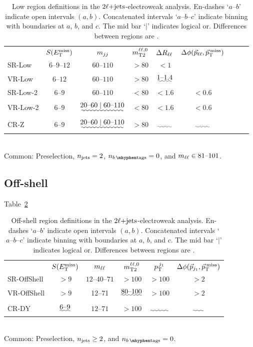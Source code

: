 \begin{table}[tp]
\centering
\begin{tabular}{lcccccccc}
& $S(E_\mathrm{T}^\mathrm{miss})$
& $m_{jj}$
& $m_\mathrm{T2}^{\ell\ell,0}$
& $\Delta R_{\ell\ell}$
& $\Delta\phi(\vec p_{\ell\ell}, \vec p_\mathrm{T}^\mathrm{\:miss})$
\\[1em]
SR-Low
& $6\textrm{--}9\textrm{--}12$
& $60\textrm{--}110$
& $> 80$
& $< 1$
&
\\[.5em]
\: VR-Low
& $6\textrm{--}12$
& $60\textrm{--}110$
& $>80$
& $\uwave{1\textrm{--}1.4}$
&
\\[1em]
SR-Low-2
& $6\textrm{--}9$
& $60\textrm{--}110$
& $< 80$
& $< 1.6$
& $< 0.6$
\\[.5em]
\: VR-Low-2
& $6\textrm{--}9$
& $\uwave{20\textrm{--}60 \mid 60\textrm{--}110}$
& $< 80$
& $< 1.6$
& $< 0.6$
\\[1em]
CR-Z
& $6\textrm{--}9$
& $\uwave{20\textrm{--}60 \mid 60\textrm{--}110}$
& $> 80$
& $\uwave{\hphantom{< 1.6}}$
& $\uwave{\hphantom{< 0.6}}$
\end{tabular}
\\[1em]
Common: Preselection,
$n_\mathrm{jets} = 2$,
$\nbtag = 0$, and
$m_{\ell\ell} \in 81\textrm{--}101$.
\caption{%
Low region definitions in the $2\ell\mathrm{+jets}$-electroweak analysis.
En-dashes `$a\textrm{--}b$' indicate open intervals $(a, b)$.
Concatenated intervals `$a\textrm{--}b\textrm{--}c$' indicate binning
with boundaries at $a$, $b$, and $c$.
The mid bar `$\mid$' indicates logical or.
Differences between regions are .
}
\label{tab:2ljets_low}
\end{table}

\subsection{Off-shell}
\label{sec:2ljets_offshell}

Table~\ref{tab:2ljets_offshell}

\begin{table}[tp]
\centering
\begin{tabular}{lccccc}
& $S(E_\mathrm{T}^\mathrm{miss})$
& $m_{\ell\ell}$
& $m_\mathrm{T2}^{\ell\ell,0}$
& $p_\mathrm{T}^{\,j_1}$
& $\Delta\phi(\vec p_{j_1}, \vec p_\mathrm{T}^\mathrm{\:miss})$
\\[1em]
SR-OffShell
& $>9$
& $12\textrm{--}40\textrm{--}71$
& $>100$
& $>100$
& $>2$
\\[.5em]
\: VR-OffShell
& $>9$
&  12--71
& $\uwave{80\textrm{--}100}$
& $> 100$
& $> 2$
\\[1em]
CR-DY
& $\uwave{6\textrm{--}9}$
& $12\textrm{--}71$
& $> 100$
& $\uwave{\hphantom{> 100}}$
& $\uwave{\hphantom{> 2}}$
\end{tabular}
\\[1em]
Common: Preselection,
$n_\mathrm{jets} \geq 2$, and
$\nbtag = 0$.
\caption{%
Off-shell region definitions in the $2\ell\mathrm{+jets}$-electroweak analysis.
En-dashes `$a\textrm{--}b$' indicate open intervals $(a, b)$.
Concatenated intervals `$a\textrm{--}b\textrm{--}c$' indicate binning
with boundaries at $a$, $b$, and $c$.
The mid bar `$\mid$' indicates logical or.
Differences between regions are .
}
\label{tab:2ljets_offshell}
\end{table}



